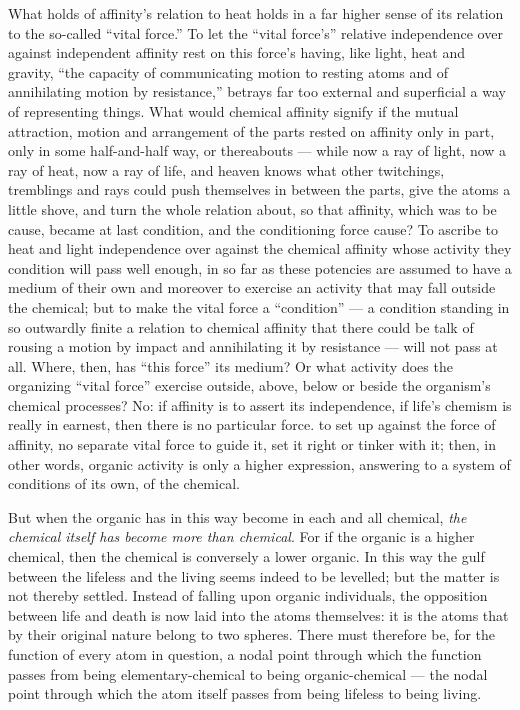 \documentclass[12pt,a4paper]{book}
\begin{document}
What holds of affinity's relation to heat holds in a far higher sense of its
relation to the so-called ``vital force.'' To let the ``vital force's'' relative
independence over against independent affinity rest on this force's having,
like light, heat and gravity, ``the capacity of communicating motion to resting
atoms and of annihilating motion by resistance,'' betrays far too external and
superficial a way of representing things. What would chemical affinity signify
if the mutual attraction, motion and arrangement of the parts rested on
affinity only in part, only in some half-and-half way, or thereabouts --- while
now a ray of light, now a ray of heat, now a ray of life, and heaven knows
what other twitchings, tremblings and rays could push themselves in between the
parts, give the atoms a little shove, and turn the whole relation about, so
that affinity, which was to be cause, became at last condition, and the
conditioning force cause? To ascribe to heat and light independence over
against the chemical affinity whose activity they condition will pass well
enough, in so far as these potencies are assumed to have a medium of their own
and moreover to exercise an activity that may fall outside the chemical; but to
make the vital force a ``condition'' --- a condition standing in so outwardly
finite a relation to chemical affinity that there could be talk of rousing a
motion by impact and annihilating it by resistance --- will not pass at all.
Where, then, has ``this force'' its medium? Or what activity does the
organizing ``vital force'' exercise outside, above, below or beside the
organism's chemical processes? No: if affinity is to assert its independence,
if life's chemism is really in earnest, then there is no particular force. to
set up against the force of affinity, no separate vital force to guide it, set
it right or tinker with it; then, in other words, organic activity is only a
higher expression, answering to a system of conditions of its own, of the
chemical.

But when the organic has in this way become in each and all chemical, \emph{the
chemical itself has become more than chemical}. For if the organic is a higher
chemical, then the chemical is conversely a lower organic. In this way the gulf
between the lifeless and the living seems indeed to be levelled; but the matter
is not thereby settled. Instead of falling upon organic individuals, the
opposition between life and death is now laid into the atoms themselves: it is
the atoms that by their original nature belong to two spheres. There must
therefore be, for the function of every atom in question, a nodal point through
which the function passes
from being elementary-chemical to being organic-chemical --- the nodal point
through which the atom itself passes from being lifeless to being living.
\end{document}
